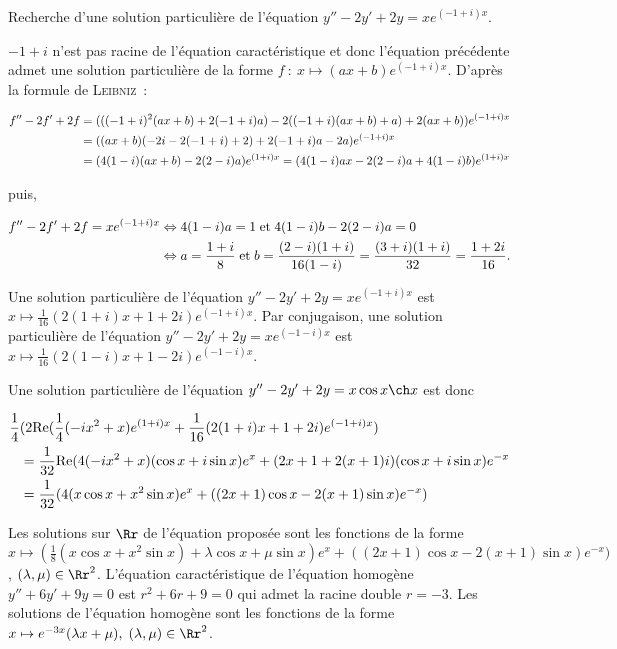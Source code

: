 {{Recherche d'une solution particulière de l'équation $y''-2y'+2y=xe^{(-1+i)x}$.

$-1+i$ n'est pas racine de l'équation caractéristique et donc
l'équation précédente admet une solution particulière de la forme $f~:~x\mapsto(ax+b)e^{(-1+i)x}$. D'après la formule
de \textsc{Leibniz}~:

\begin{align*}\ensuremath
f''-2f'+2f&=(((-1+i)^2(ax+b)+2(-1+i)a)-2((-1+i)(ax+b)+a)+2(ax+b))e^{(-1+i)x}\\
 &=((ax+b)(-2i-2(-1+i)+2)+2(-1+i)a-2a)e^{(-1+i)x}\\
 &=(4(1-i)(ax+b)-2(2-i)a)e^{(1+i)x}=(4(1-i)ax-2(2-i)a+4(1-i)b)e^{(1+i)x}
\end{align*}

puis,

\begin{align*}\ensuremath
f''-2f'+2f=xe^{(-1+i)x}&\Leftrightarrow4(1-i)a=1\;\mbox{et}\;4(1-i)b-2(2-i)a=0\\
 &\Leftrightarrow
a=\frac{1+i}{8}\;\mbox{et}\;b=\frac{(2-i)(1+i)}{16(1-i)}=\frac{(3+i)(1+i)}{32}=\frac{1+2i}{16}.
\end{align*}

Une solution particulière de l'équation $y''-2y'+2y=xe^{(-1+i)x}$ est $x\mapsto\frac{1}{16}(2(1+i)x+1+2i)e^{(-1+i)x}$.
Par conjugaison, une solution particulière de l'équation $y''-2y'+2y=xe^{(-1-i)x}$ est
$x\mapsto\frac{1}{16}(2(1-i)x+1-2i)e^{(-1-i)x}$.

Une solution particulière de l'équation $y''-2y'+2y=x\cos x\ch x$ est donc

\begin{align*}\ensuremath
\frac{1}{4}&(2\mbox{Re}(\frac{1}{4}(-ix^2+x)e^{(1+i)x}+\frac{1}{16}(2(1+i)x+1+2i)e^{(-1+i)x})\\
 &=\frac{1}{32}\mbox{Re}(4(-ix^2+x)(\cos x+i\sin x)e^x+(2x+1+2(x+1)i)(\cos x+i\sin x)e^{-x}\\
 &=\frac{1}{32}(4(x\cos x+x^2\sin x)e^x+((2x+1)\cos x-2(x+1)\sin x)e^{-x})
\end{align*}

Les solutions sur $\Rr$ de l'équation proposée sont les fonctions de la forme $x\mapsto(\frac{1}{8}(x\cos x+x^2\sin
x)+\lambda\cos x+\mu\sin x)e^x+((2x+1)\cos x-2(x+1)\sin x)e^{-x})$, $(\lambda,\mu)\in\Rr^2$.
L'équation caractéristique de l'équation homogène $y''+6y'+9y=0$ est $r^2+6r+9=0$ qui admet la racine double
$r=-3$. Les solutions de l'équation homogène sont les fonctions de la forme $x\mapsto
e^{-3x}(\lambda x+\mu),\;(\lambda,\mu)\in\Rr^2$.

}}
